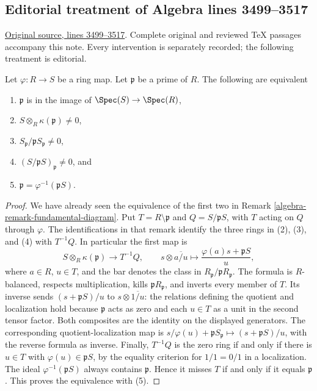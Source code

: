 \subsection{Editorial treatment of Algebra lines 3499--3517}

\hypertarget{algebra-context-015}{}

\noindent\href{https://github.com/stacks/stacks-project/blob/a04446e57ec1fbc252a871afcec7752fb2807b14/algebra.tex\#L3499}{Original source, lines 3499--3517}. Complete original and reviewed TeX passages accompany this note. Every intervention is separately recorded; the following treatment is editorial.


\begin{lemma}
\label{editorial-source-lemma-in-image}
Let $\varphi : R \to S$ be a ring map. Let $\mathfrak p$
be a prime of $R$. The following are equivalent
\begin{enumerate}
\item $\mathfrak p$ is in the image of
$\Spec(S) \to \Spec(R)$,
\item $S \otimes_R \kappa(\mathfrak p) \not = 0$,
\item $S_{\mathfrak p}/\mathfrak p S_{\mathfrak p} \not = 0$,
\item $(S/\mathfrak pS)_{\mathfrak p} \not = 0$, and
\item $\mathfrak p = \varphi^{-1}(\mathfrak pS)$.
\end{enumerate}
\end{lemma}

\begin{proof}
We have already seen the equivalence of the first two
in Remark \ref{algebra-remark-fundamental-diagram}.
Put $T=R\setminus\mathfrak p$ and $Q=S/\mathfrak pS$, with
$T$ acting on $Q$ through $\varphi$.
The identifications in that remark identify the three rings in
(2), (3), and (4) with $T^{-1}Q$. In particular the first map is
$$
S\otimes_R\kappa(\mathfrak p)\longrightarrow T^{-1}Q,\qquad
s\otimes\overline{a/u}\longmapsto
\frac{\varphi(a)s+\mathfrak pS}{u},
$$
where $a\in R$, $u\in T$, and the bar denotes the class in
$R_{\mathfrak p}/\mathfrak pR_{\mathfrak p}$.
The formula is $R$-balanced, respects multiplication, kills
$\mathfrak pR_{\mathfrak p}$, and inverts every member of $T$.
Its inverse sends $(s+\mathfrak pS)/u$ to
$s\otimes\overline{1/u}$: the relations defining the quotient
and localization hold because $\mathfrak p$ acts as zero and
each $u\in T$ as a unit in the second tensor factor.
Both composites are the identity on the displayed generators.
The corresponding quotient-localization map is
$s/\varphi(u)+\mathfrak pS_{\mathfrak p}\mapsto
(s+\mathfrak pS)/u$, with the reverse formula as inverse.
Finally, $T^{-1}Q$ is the zero ring if and only if there is
$u\in T$ with $\varphi(u)\in\mathfrak pS$, by the equality
criterion for $1/1=0/1$ in a localization.
The ideal $\varphi^{-1}(\mathfrak pS)$ always contains
$\mathfrak p$. Hence it misses $T$ if and only if it equals
$\mathfrak p$. This proves the equivalence with (5).
\end{proof}



